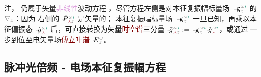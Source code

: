 注， 仍属于矢量\textcolor{Plum}{非线性}波动方程 ，尽管方程左侧是对\textcolor{PineGreen}{本征复振幅}标量场 $\xint{\begin{smallmatrix} ~ \\ {}^{}_{\mathcolor{gray}{-}} \\ ~ \end{smallmatrix}}{09}{\mathtt{g}}^{\;\!\mathcolor{gray}{\omega} \textcolor{PineGreen}{\imath}}_{\;\! \mathcolor{gray}{z}}$ 的 $\mathcolor{gray}{\nabla_z}$：因为 {\one} 右侧的 $\xint{\mathcolor{gray}{-}}{25}{\bar{P}}^{\;\! \mathcolor{gray}{\omega} \textcolor{PineGreen}{\imath}}_{\;\! \textcolor{Maroon}{\Yup} \mathcolor{gray}{z}}$ 是矢量的；{\two} \textcolor{PineGreen}{本征复振幅}标量场 $\xint{\begin{smallmatrix} ~ \\ {}^{}_{\mathcolor{gray}{-}} \\ ~ \end{smallmatrix}}{09}{\mathtt{g}}^{\;\!\mathcolor{gray}{\omega} \textcolor{PineGreen}{\imath}}_{\;\! \mathcolor{gray}{z}}$ 一旦已知，再乘以\textcolor{PineGreen}{本征偏振态} $\xint{{}^{}_{\mathcolor{gray}{-}}}{10}{\hat{g}}^{\;\!\mathcolor{gray}{\omega} \textcolor{PineGreen}{\imath}}_{\;\! \textcolor{Maroon}{\Yup}}$ 后，可直接转换为矢量\textcolor{Maroon}{时空谱}三分量 $\xint{{}^{}_{\mathcolor{gray}{-}}}{10}{\bar{g}}^{\;\!\mathcolor{gray}{\omega} \textcolor{PineGreen}{\imath}}_{\;\! \textcolor{Maroon}{\Yup} \mathcolor{gray}{z}} := \xint{\begin{smallmatrix} ~ \\ {}^{}_{\mathcolor{gray}{-}} \\ ~ \end{smallmatrix}}{09}{\mathtt{g}}^{\;\!\mathcolor{gray}{\omega} \textcolor{PineGreen}{\imath}}_{\;\! \mathcolor{gray}{z}} \xint{{}^{}_{\mathcolor{gray}{-}}}{10}{\hat{g}}^{\;\!\mathcolor{gray}{\omega} \textcolor{PineGreen}{\imath}}_{\;\! \textcolor{Maroon}{\Yup}}$，或通过  一步到位至电矢量场\textcolor{Maroon}{傅立叶谱} $\xint{\mathcolor{gray}{-}}{25}{\bar{E}}^{\;\!\mathcolor{gray}{\omega}}_{\;\! \mathcolor{gray}{z}}$。

\subsection{脉冲光倍频 - 电场本征复振幅方程}\label{ssec:SHG_spectrum}

